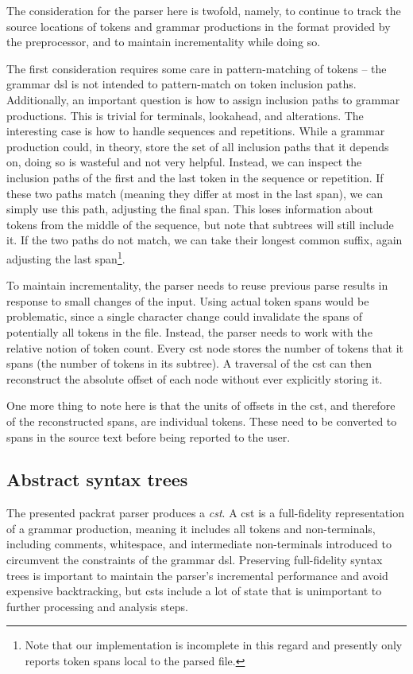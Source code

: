 The consideration for the parser here is twofold, namely, to continue to track
the source locations of tokens and grammar productions in the format provided by
the preprocessor, and to maintain incrementality while doing so.

The first consideration requires some care in pattern-matching of tokens -- the
grammar \acrshort{dsl} is not intended to pattern-match on token inclusion
paths. Additionally, an important question is how to assign inclusion paths to
grammar productions. This is trivial for terminals, lookahead, and alterations.
The interesting case is how to handle sequences and repetitions. While a grammar
production could, in theory, store the set of all inclusion paths that it
depends on, doing so is wasteful and not very helpful. Instead, we can inspect
the inclusion paths of the first and the last token in the sequence or
repetition. If these two paths match (meaning they differ at most in the last
span), we can simply use this path, adjusting the final span. This loses
information about tokens from the middle of the sequence, but note that subtrees
will still include it. If the two paths do not match, we can take their longest
common suffix, again adjusting the last span\footnote{Note that our
implementation is incomplete in this regard and presently only reports token
spans local to the parsed file.}.

To maintain incrementality, the parser needs to reuse previous parse results in
response to small changes of the input. Using actual token spans would be
problematic, since a single character change could invalidate the spans of
potentially all tokens in the file. Instead, the parser needs to work with the
relative notion of token count. Every \acrshort{cst} node stores the number of
tokens that it spans (the number of tokens in its subtree). A traversal of the
\acrshort{cst} can then reconstruct the absolute offset of each node without
ever explicitly storing it.

One more thing to note here is that the units of offsets in the \acrshort{cst},
and therefore of the reconstructed spans, are individual tokens. These need to
be converted to spans in the source text before being reported to the user.

\subsection{Abstract syntax trees}

The presented packrat parser produces a \emph{\acrfull{cst}}. A \acrlong{cst} is
a full-fidelity representation of a grammar production, meaning it includes all
tokens and non-terminals, including comments, whitespace, and intermediate
non-terminals introduced to circumvent the constraints of the grammar
\acrshort{dsl}. Preserving full-fidelity syntax trees is important to maintain
the parser's incremental performance and avoid expensive backtracking, but
\acrshort{cst}s include a lot of state that is unimportant to further processing
and analysis steps.

